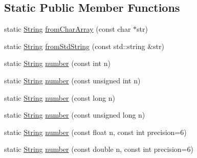 \subsection*{Static Public Member Functions}
\begin{DoxyCompactItemize}
\item 
static \hyperlink{classprism_1_1_string}{String} \hyperlink{classprism_1_1_string_a11d319bfb0bf70ffdf71d2fc65b963db}{from\+Char\+Array} (const char $\ast$str)
\item 
static \hyperlink{classprism_1_1_string}{String} \hyperlink{classprism_1_1_string_a8692b9a7e4c25f349bb83b53ff3d6f36}{from\+Std\+String} (const std\+::string \&str)
\item 
static \hyperlink{classprism_1_1_string}{String} \hyperlink{classprism_1_1_string_a634481b6536dde9995b44082fbcbe0c5}{number} (const int n)
\item 
static \hyperlink{classprism_1_1_string}{String} \hyperlink{classprism_1_1_string_a4c8e81538cb37882488ff35b03b00f19}{number} (const unsigned int n)
\item 
static \hyperlink{classprism_1_1_string}{String} \hyperlink{classprism_1_1_string_a3eae3ed3829125b583ae9050849b5d4d}{number} (const long n)
\item 
static \hyperlink{classprism_1_1_string}{String} \hyperlink{classprism_1_1_string_a0da92ce265e3b9dee756746634a2ed1c}{number} (const unsigned long n)
\item 
static \hyperlink{classprism_1_1_string}{String} \hyperlink{classprism_1_1_string_a31d878bd52b7576b00152b9e832c78b8}{number} (const float n, const int precision=6)
\item 
static \hyperlink{classprism_1_1_string}{String} \hyperlink{classprism_1_1_string_a8662487577697139f34b0a98f339a35d}{number} (const double n, const int precision=6)
\end{DoxyCompactItemize}
